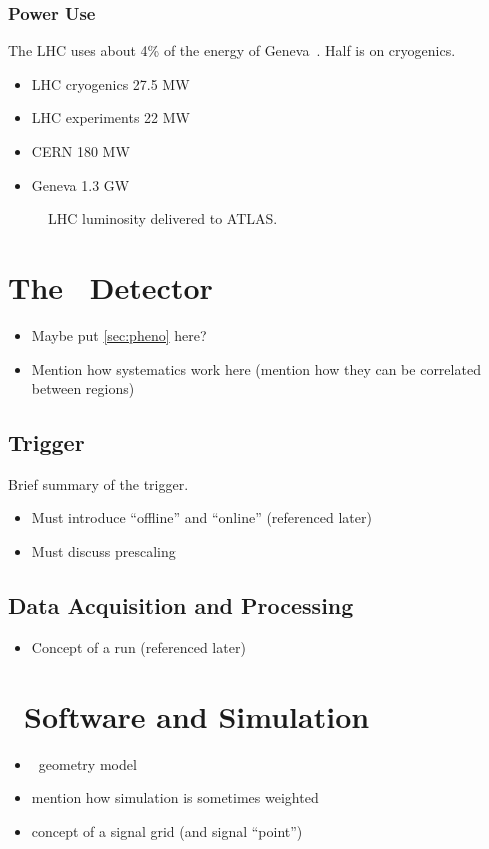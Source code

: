 \subsubsection{Power Use}
The LHC uses about 4\% of the energy of Geneva~\cite{lhc-energy}. Half is on cryogenics.
\begin{itemize}
\item LHC cryogenics 27.5 MW
\item LHC experiments 22 MW
\item CERN 180 MW
\item Geneva 1.3 GW
\end{itemize}
\begin{figure}
  \caption[LHC Luminosity Delivered to ATLAS]{%
    LHC luminosity delivered to ATLAS.}
\end{figure}


\section{The \atlas\ Detector}
\label{sec:atlas}
\begin{itemize}
\item Maybe put \cref{sec:pheno} here?
\item Mention how systematics work here (mention how they can be correlated between regions)
\end{itemize}
\subsection{Trigger}
\label{sec:trigger}
Brief summary of the trigger.
\begin{itemize}
\item Must introduce ``offline'' and ``online'' (referenced later)
\item Must discuss prescaling
\end{itemize}
\subsection{Data Acquisition and Processing}
\begin{itemize}
\item Concept of a run (referenced later)
\end{itemize}
\section{\atlas\ Software and Simulation}
\label{sec:software}
\begin{itemize}
\item \atlas\ geometry model
\item mention how simulation is sometimes weighted
\item concept of a signal grid (and signal ``point'')
\end{itemize}
